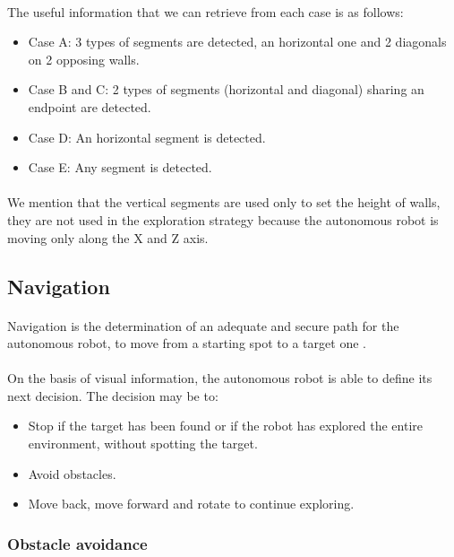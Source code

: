 \documentclass[12pt]{report}
\begin{document}
 \paragraph{}
 The useful information that we can retrieve from each case is as follows:
 \begin{itemize}
 	\item Case A: 3 types of segments are detected, an horizontal one and 2 diagonals on 2 opposing walls.
 	\item Case B and C: 2 types of segments (horizontal and diagonal) sharing an endpoint are detected.
 	\item Case D: An horizontal segment is detected.
 	\item Case E: Any segment is detected.
 	
 \end{itemize}
 \paragraph{}
 We mention that the vertical segments are used only to set the height of walls, they are not used in the exploration strategy because the autonomous robot is moving only along the X and Z axis.
 \subsection{Navigation}
     \paragraph{}
 Navigation is the determination of an adequate and secure path for the autonomous robot, to move from a starting spot to a target one \cite{bonin-font_visual_2008}.
 \paragraph{}
 On the basis of visual information, the autonomous robot is able to define its next decision. The decision may be to:
 \begin{itemize}
 	\item Stop if the target has been found or if the robot has explored the entire environment, without spotting the target.
 	\item Avoid obstacles.
 	\item Move back, move forward and rotate to continue exploring.
 \end{itemize}

\subsubsection{Obstacle avoidance}
\end{document}

